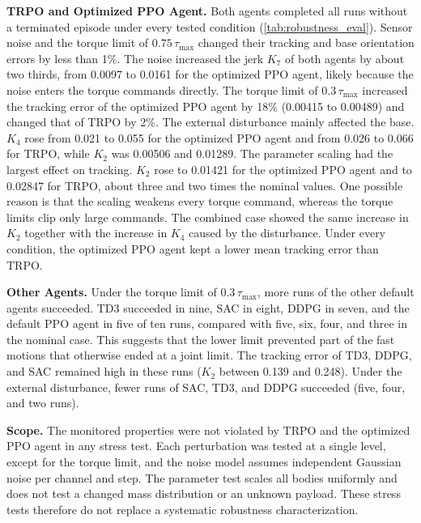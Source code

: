 \documentclass{ieeeaccess}
\begin{document}
\textbf{TRPO and Optimized PPO Agent.} Both agents completed all runs without a terminated episode under
every tested condition (\cref{tab:robustness_eval}). Sensor noise and the torque limit of
$0.75\,\tau_{\max}$ changed their tracking and base orientation errors by less than 1\%. The noise increased
the jerk $K_7$ of both agents by about two thirds, from 0.0097 to 0.0161 for the optimized PPO agent,
likely because the noise enters the torque commands directly. The torque limit of $0.3\,\tau_{\max}$
increased the tracking error of the optimized PPO agent by 18\% (0.00415 to 0.00489) and changed that of
TRPO by 2\%. The external disturbance mainly affected the base. $K_4$ rose from 0.021 to 0.055 for the
optimized PPO agent and from 0.026 to 0.066 for TRPO, while $K_2$ was 0.00506 and 0.01289. The
parameter scaling had the largest effect on tracking. $K_2$ rose to 0.01421 for the optimized PPO agent
and to 0.02847 for TRPO, about three and two times the nominal values. One possible reason is that the
scaling weakens every torque command, whereas the torque limits clip only large commands. The combined
case showed the same increase in $K_2$ together with the increase in $K_4$ caused by the disturbance.
Under every condition, the optimized PPO agent kept a lower mean tracking error than TRPO.

\textbf{Other Agents.} Under the torque limit of $0.3\,\tau_{\max}$, more runs of the other default agents
succeeded. TD3 succeeded in nine, SAC in eight, DDPG in seven, and the default PPO agent in five of ten
runs, compared with five, six, four, and three in the nominal case. This suggests that the lower limit
prevented part of the fast motions that otherwise ended at a joint limit. The tracking error of TD3, DDPG,
and SAC remained high in these runs ($K_2$ between 0.139 and 0.248). Under the external disturbance, fewer
runs of SAC, TD3, and DDPG succeeded (five, four, and two runs).

\textbf{Scope.} The monitored properties were not violated by TRPO and the optimized PPO agent in any
stress test. Each perturbation was tested at a single level, except for the torque limit, and the noise
model assumes independent Gaussian noise per channel and step. The parameter test scales all bodies
uniformly and does not test a changed mass distribution or an unknown payload. These stress tests
therefore do not replace a systematic robustness characterization.
\end{document}

